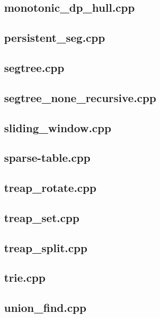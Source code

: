 \subsection{monotonic\_dp\_hull.cpp}

\subsection{persistent\_seg.cpp}

\subsection{segtree.cpp}

\subsection{segtree\_none\_recursive.cpp}

\subsection{sliding\_window.cpp}

\subsection{sparse-table.cpp}

\subsection{treap\_rotate.cpp}

\subsection{treap\_set.cpp}

\subsection{treap\_split.cpp}

\subsection{trie.cpp}

\subsection{union\_find.cpp}

